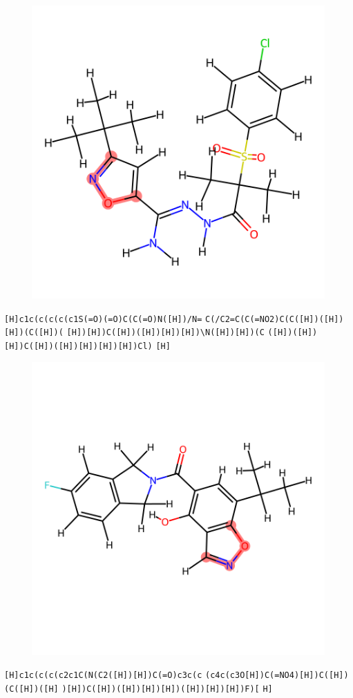 \documentclass{article}
\begin{document}
\begin{figure}[ht]
\centering
    \includegraphics{mol34.png}
\end{figure}
\verb|[H]c1c(c(c(c(c1S(=O)(=O)C(C(=O)N([H])/N=| \verb|C(/C2=C(C(=NO2)C(C([H])([H])[H])(C([H])(| \verb|[H])[H])C([H])([H])[H])[H])\N([H])[H])(C| \verb|([H])([H])[H])C([H])([H])[H])[H])[H])Cl)| \verb|[H]|

\begin{figure}[ht]
\centering
    \includegraphics{mol35.png}
\end{figure}
\verb|[H]c1c(c(c(c2c1C(N(C2([H])[H])C(=O)c3c(c| \verb|(c4c(c3O[H])C(=NO4)[H])C([H])(C([H])([H]| \verb|)[H])C([H])([H])[H])[H])([H])[H])[H])F)[| \verb|H]|
\end{document}
